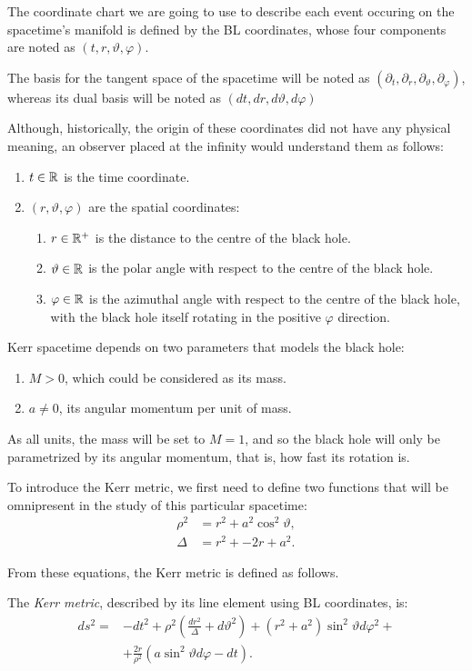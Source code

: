 The coordinate chart we are going to use to describe each event occuring on the spacetime's manifold is defined by the \ac{BL} coordinates, whose four components are noted as $(t, r, \vartheta, \varphi)$.

The basis for the tangent space of the spacetime will be noted as $(\partial_t, \partial_r, \partial_\vartheta, \partial_\varphi)$, whereas its dual basis will be noted as $(dt, dr, d\vartheta, d\varphi)$

Although, historically, the origin of these coordinates did not have any physical meaning, an observer placed at the infinity would understand them as follows:
\begin{enumerate}
	\item $t\in\mathbb{R}$ is the time coordinate.
	\item $(r, \vartheta, \varphi)$ are the spatial coordinates:
	\begin{enumerate}
		\item $r \in \mathbb{R}^+$ is the distance to the centre of the black hole.
		\item $\vartheta \in \mathbb{R}$ is the polar angle with respect to the centre of the black hole.
		\item $\varphi \in \mathbb{R}$ is the azimuthal angle with respect to the centre of the black hole, with the black hole itself rotating in the positive $\varphi$ direction.
	\end{enumerate}
\end{enumerate}

Kerr spacetime depends on two parameters that models the black hole:
\begin{enumerate}
	\item $M > 0$, which could be considered as its mass.
	\item $a \neq 0$, its angular momentum per unit of mass.
\end{enumerate}

As all units, the mass will be set to $M = 1$, and so the black hole will only be parametrized by its angular momentum, that is, how fast its rotation is.

To introduce the Kerr metric, we first need to define two functions that will be omnipresent in the study of this particular spacetime:
\begin{align}
\rho^2 &= r^2 + a^2\cos^2\vartheta, \\
\Delta &= r^2 + -2r + a^2.
\end{align}

From these equations, the Kerr metric is defined as follows.
\begin{definition}
	The \emph{Kerr metric}, described by its line element using \ac{BL} coordinates, is:
	\begin{align}
	\label{eq:kerrmetric}
	ds^2 = &-dt^2 + \rho^2\left(\frac{dr^2}{\Delta} + d\vartheta^2\right) + \left(r^2 + a^2\right)\sin^2\vartheta d\varphi^2 + \\
	\nonumber
	&+ \frac{2r}{\rho^2}\left(a\sin^2\vartheta d\varphi - dt\right).
	\end{align}
\end{definition}

